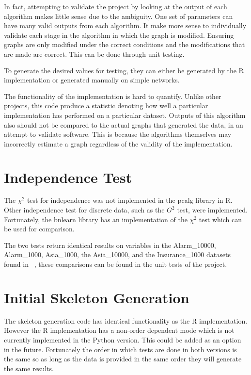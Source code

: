 \documentclass{UoYCSproject}
\begin{document}
In fact, attempting to validate the project by looking at the output of each algorithm makes little sense due to the ambiguity. One set of parameters can have many valid outputs from each algorithm. It make more sense to individually validate each stage in the algorithm in which the graph is modified. Ensuring graphs are only modified under the correct conditions and the modifications that are made are correct. This can be done through unit testing.

To generate the desired values for testing, they can either be generated by the R implementation or generated manually on simple networks.

The functionality of the implementation is hard to quantify. Unlike other projects, this code produce a statistic denoting how well a particular implementation has performed on a particular dataset. Outputs of this algorithm also should not be compared to the actual graphs that generated the data, in an attempt to validate software. This is because the algorithms themselves may incorrectly estimate a graph regardless of the validity of the implementation.

\section{Independence Test}
The $\chi^2$ test for independence was not implemented in the pcalg library in R. Other independence test for discrete data, such as the $G^2$ test, were implemented. Fortunately, the bnlearn library has an implementation of the $\chi^2$ test which can be used for comparison.

The two tests return identical results on variables in the Alarm\_10000, Alarm\_1000, Asia\_1000, the Asia\_10000, and the Insurance\_1000 datasets found in ~\parencite{data}, these comparisons can be found in the unit tests of the project.

\section{Initial Skeleton Generation}
The skeleton generation code has identical functionality as the R implementation. However the R implementation has a non-order dependent mode which is not currently implemented in the Python version. This could be added as an option in the future. Fortunately the order in which tests are done in both versions is the same so as long as the data is provided in the same order they will generate the same results.
\end{document}
